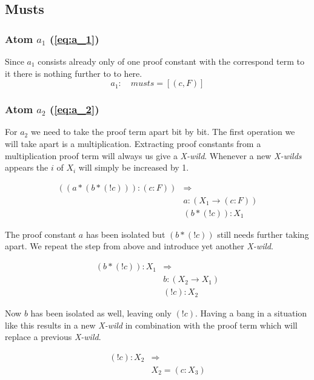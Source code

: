\subsection{Musts}
\subsubsection[First atom]{Atom $a_1$ (\ref{eq:a_1})}
Since $a_1$ consists already only of one proof constant with the correspond term to it there is nothing further to to here.
\begin{equation}
	a_1: \quad musts = [(c, F)]
\end{equation}

\subsubsection[Second atom]{Atom $a_2$ (\ref{eq:a_2})}
For $a_2$ we need to take the proof term apart bit by bit. The first operation we will take apart is a multiplication. Extracting proof constants from a multiplication proof term will always us give a \emph{X-wild}. Whenever a new \emph{X-wilds} appears the $i$ of $X_i$ will simply be increased by 1.

\begin{equation*}\label{eq:musts1_a_2}
	\begin{split}
		((a *(b* (! c))):(c:F)) & \Rightarrow \\
		& a : (X_1 \rightarrow (c:F)) \\
		& (b*(! c)): X_1
	\end{split}	
\end{equation*}

The proof constant $a$ has been isolated but $(b*(! c))$ still needs further taking apart. We repeat the step from above and introduce yet another \emph{X-wild}.

\begin{equation*}
	\begin{split}
	(b*(! c)): X_1 & \Rightarrow \\
	& b : (X_2 \rightarrow X_1) \\
	& (! c) : X_2
	\end{split}	
\end{equation*}

Now $b$ has been isolated as well, leaving only $(! c)$. Having a bang in a situation like this results in a new \emph{X-wild} in combination with the proof term which will replace a previous \emph{X-wild}.

\begin{equation*}
	\begin{split}
		(! c) : X_2 & \Rightarrow \\
		& X_2 = (c:X_3)
	\end{split}	
\end{equation*}

